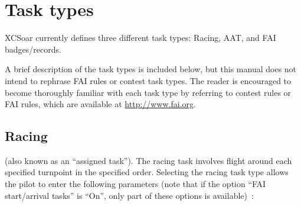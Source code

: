 \section{Task types}
XCSoar currently defines three different task types: Racing, AAT, and FAI badges/records.

A brief description of the task types is included below, but this manual does 
not intend to rephrase FAI rules or contest task types. The reader is encouraged 
to become thoroughly familiar with each task type by referring to contest rules 
or FAI rules, which are available at \url{http://www.fai.org}. 


\subsection*{Racing}\label{sec:task-type-racing}
(also known as an ``assigned task'').  The racing task involves flight
around each specified turnpoint in the specified order.  Selecting the racing task 
type allows the pilot to enter the following parameters
(note that if the option
``FAI start/arrival tasks'' is ``On'', only part of these options is available)~:
